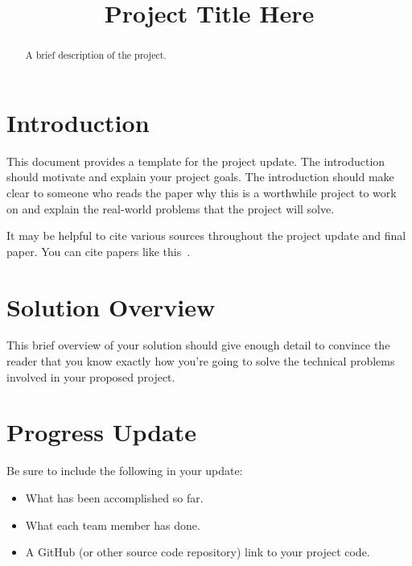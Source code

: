 \documentclass[conference]{IEEEtran}
\begin{document}
\title{Project Title Here}


\author{
\and
{}
\and
{}
}

\maketitle

\begin{abstract}

A brief description of the project.

\end{abstract}


\section{Introduction}

This document provides a template for the project update. The introduction should motivate and explain your project goals. The introduction should make clear to someone who reads the paper why this is a worthwhile project to work on and explain the real-world problems that the project will solve.

It may be helpful to cite various sources throughout the project update and final paper. You can cite papers like this~\cite{item1}.

\section{Solution Overview}

This brief overview of your solution should give enough detail to convince the reader that you know exactly how you're going to solve the technical problems involved in your proposed project.

\section{Progress Update}

Be sure to include the following in your update:
\begin{itemize}
\item What has been accomplished so far.

\item What each team member has done.

\item A GitHub (or other source code repository) link to your project code.
\end{itemize}
\end{document}

